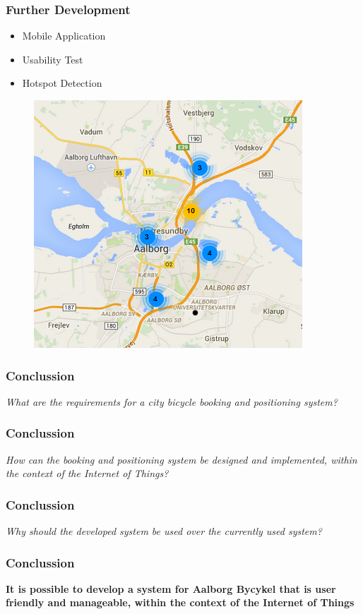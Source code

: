 \begin{frame}
\frametitle{Further Development}
\begin{itemize}
	\item Mobile Application
	\item Usability Test
	\item Hotspot Detection
\end{itemize}
\begin{figure}
\centering
\includegraphics[scale=0.5]{MarkerClusterer}
\end{figure}
\end{frame}

\begin{frame}
\frametitle{Conclussion}
\begin{center}
	\textit{What are the requirements for a city bicycle booking and positioning system?}
\end{center}
\end{frame}

\begin{frame}
	\frametitle{Conclussion}
	\begin{center}
		\textit{How can the booking and positioning system be designed and implemented, within the context of the Internet of Things?}
	\end{center}
\end{frame}

\begin{frame}
	\frametitle{Conclussion}
	\begin{center}
		\textit{Why should the developed system be used over the currently used system?}
	\end{center}
\end{frame}

\begin{frame}
	\frametitle{Conclussion}
	\begin{center}
		\textbf{It is possible to develop a system for Aalborg Bycykel that is user friendly and manageable, within the context of the Internet of Things}
	\end{center}
\end{frame}